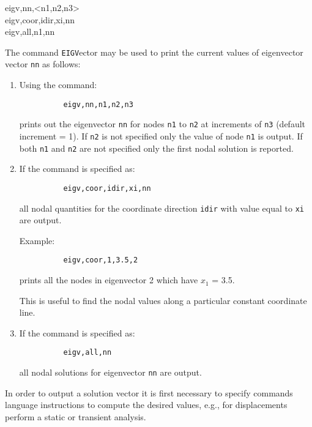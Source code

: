 \hspace{1.2cm} {{ eigv,nn,<n1,n2,n3> \hfill}} \\{\smallskip}
\hspace{1.0cm} {{ eigv,coor,idir,xi,nn \hfill}} \\{\smallskip}
\hspace{1.0cm} {{ eigv,all,n1,nn \hfill}} \\{\smallskip}
\headb

The command {\tt EIGV}ector may be used to print the
current values of eigenvector vector \texttt{nn} as follows:

\begin{enumerate}
\item{
Using the command:

\begin{verbatim}
          eigv,nn,n1,n2,n3
\end{verbatim}
prints out the eigenvector \texttt{nn} for nodes
{\tt n1} to {\tt n2} at increments of {\tt n3} (default increment = 1).  If
{\tt n2} is not specified only the value of node {\tt n1} is
output.  If both {\tt n1} and {\tt n2} are not specified only
the first nodal solution is reported.}

\item{
If the command is specified as:

\begin{verbatim}
          eigv,coor,idir,xi,nn
\end{verbatim}
all nodal quantities for the coordinate direction {\tt idir}
with value equal to {\tt xi} are output.

Example: 
\begin{verbatim}
          eigv,coor,1,3.5,2
\end{verbatim}
prints all the nodes in eigenvector 2 which have $x_1$ = 3.5.

This is useful to find the nodal values along a particular
constant coordinate line.}

\item{
If the command is specified as:

\begin{verbatim}
          eigv,all,nn
\end{verbatim}
all nodal solutions for eigenvector \texttt{nn} are output.}
\end{enumerate}

In order to output a solution vector it is first necessary to
specify commands language instructions to compute the desired
values, e.g., for displacements perform a static or transient analysis.

\vfill\eject
